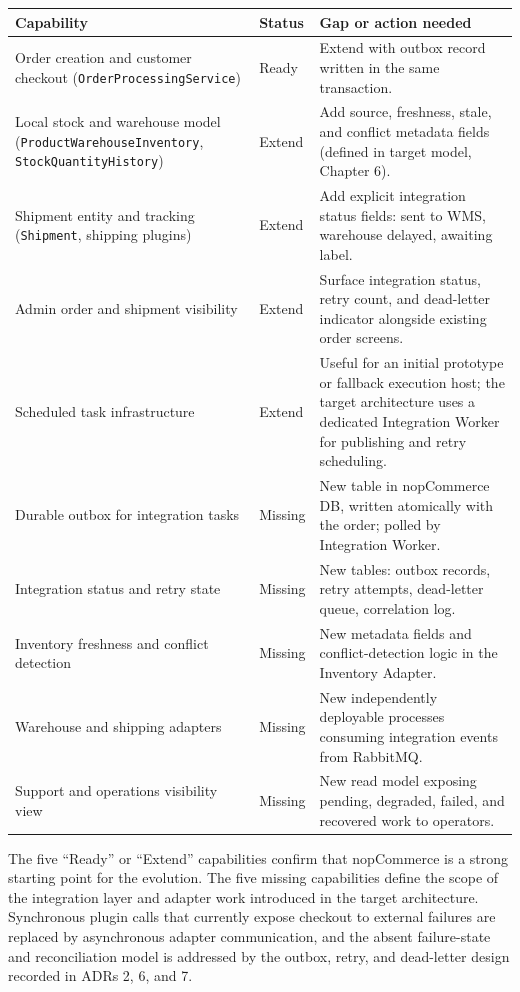 \begingroup
\small
\setlength{\tabcolsep}{4pt}
\renewcommand{\arraystretch}{1.15}
\begin{center}
\begin{tabular}{|p{}|p{}|p{}|}
\hline
\textbf{Capability} & \textbf{Status} & \textbf{Gap or action needed} \\
\hline
Order creation and customer checkout (\texttt{OrderProcessingService}) & Ready & Extend with outbox record written in the same transaction. \\
\hline
Local stock and warehouse model (\texttt{ProductWarehouseInventory}, \texttt{StockQuantityHistory}) & Extend & Add source, freshness, stale, and conflict metadata fields (defined in target model, Chapter 6). \\
\hline
Shipment entity and tracking (\texttt{Shipment}, shipping plugins) & Extend & Add explicit integration status fields: sent to WMS, warehouse delayed, awaiting label. \\
\hline
Admin order and shipment visibility & Extend & Surface integration status, retry count, and dead-letter indicator alongside existing order screens. \\
\hline
Scheduled task infrastructure & Extend & Useful for an initial prototype or fallback execution host; the target architecture uses a dedicated Integration Worker for publishing and retry scheduling. \\
\hline
Durable outbox for integration tasks & Missing & New table in nopCommerce DB, written atomically with the order; polled by Integration Worker. \\
\hline
Integration status and retry state & Missing & New tables: outbox records, retry attempts, dead-letter queue, correlation log. \\
\hline
Inventory freshness and conflict detection & Missing & New metadata fields and conflict-detection logic in the Inventory Adapter. \\
\hline
Warehouse and shipping adapters & Missing & New independently deployable processes consuming integration events from RabbitMQ. \\
\hline
Support and operations visibility view & Missing & New read model exposing pending, degraded, failed, and recovered work to operators. \\
\hline
\end{tabular}
\end{center}
\endgroup

The five ``Ready'' or ``Extend'' capabilities confirm that nopCommerce is a strong starting
point for the evolution. The five missing capabilities define the scope of the integration
layer and adapter work introduced in the target architecture. Synchronous plugin calls that
currently expose checkout to external failures are replaced by asynchronous adapter
communication, and the absent failure-state and reconciliation model is addressed by the
outbox, retry, and dead-letter design recorded in ADRs 2, 6, and 7.
